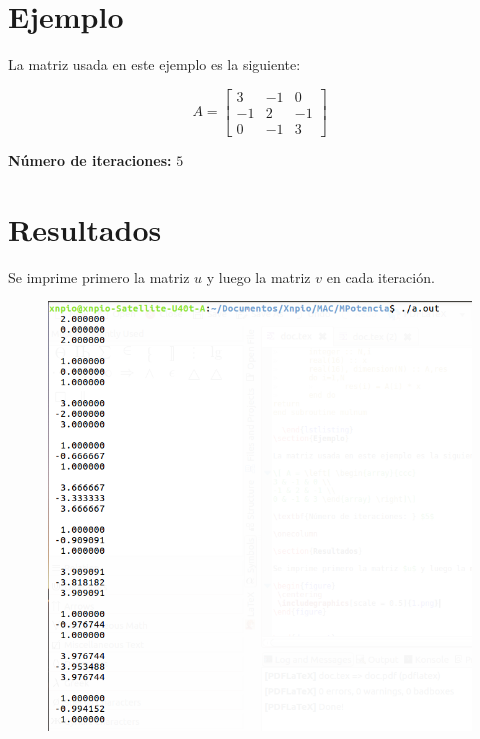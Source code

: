 \documentclass[a4paper,12pt]{article}
\begin{document}
\section{Ejemplo}

La matriz usada en este ejemplo es la siguiente:

\[ A = \left[ \begin{array}{ccc}
3 & -1 & 0 \\
-1 & 2 & -1 \\
0 & -1 & 3 \end{array} \right]\]

\textbf{Número de iteraciones: } $5$

\onecolumn

\section{Resultados}

Se imprime primero la matriz $u$ y luego la matriz $v$ en cada iteración.

\begin{figure}[h]
 \centering
 \includegraphics[scale = 0.5]{1.png}
\end{figure}
\end{document}
